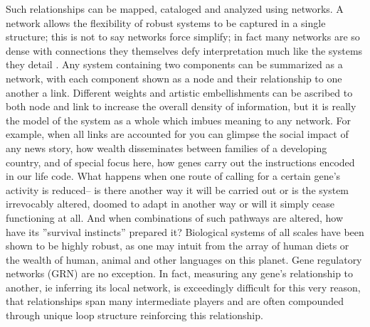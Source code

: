 Such relationships can be mapped, cataloged and analyzed using networks. A network allows the flexibility of robust systems to be captured in a single structure; this is not to say networks force simplify; in fact many networks are so dense with connections they themselves defy interpretation much like the systems they detail \citep{dianati2016unwinding}. Any system containing two components can be summarized as a network, with each component shown as a node and their relationship to one another a link. Different weights and artistic embellishments can be ascribed to both node and link to increase the overall density of information, but it is really the model of the system as a whole which imbues meaning to any network. For example, when all links are accounted for you can glimpse the social impact of any news story, how wealth disseminates between families of a developing country, and of special focus here, how genes carry out the instructions encoded in our life code. What happens when one route of calling for a certain gene's activity is reduced-- is there another way it will be carried out or is the system irrevocably altered, doomed to adapt in another way or will it simply cease functioning at all. And when combinations of such pathways are altered, how have its ''survival instincts'' prepared it? Biological systems of all scales have been shown to be highly robust, as one may intuit from the array of human diets or the wealth of human, animal and other languages on this planet. Gene regulatory networks (GRN) are no exception. In fact, measuring any gene's relationship to another, ie inferring its local network, is exceedingly difficult for this very reason, that relationships span many intermediate players and are often compounded through unique loop structure reinforcing this relationship.

